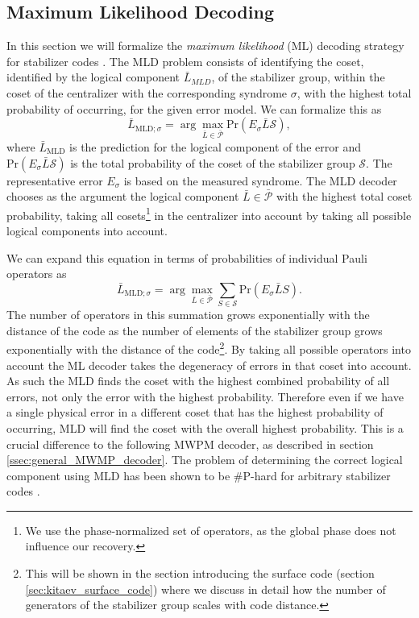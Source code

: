 \subsection{Maximum Likelihood Decoding}\label{ssec:general_ML_decoder}

In this section we will formalize the \emph{maximum likelihood} (ML) decoding strategy for stabilizer codes \cite{mld_decoding_intro_luis}.
The MLD problem consists of identifying the coset, identified by the logical component $\bar{L}_{MLD}$, of the stabilizer group, 
within the coset of the centralizer with the corresponding syndrome $\sigma$, with the highest total probability of occurring, for the given error model.
We can formalize this as
\begin{equation}
    \bar{L}_{\text{MLD};\sigma} = \arg \max_{\bar{L} \in  {\bar{\mathcal{P}}}} \text{Pr}(E_\sigma \bar{L} \mathcal{S}), 
\end{equation}
where $\bar{L}_{\text{MLD}}$ is the prediction for the logical component of the error and
$\text{Pr}(E_\sigma \bar{L}\mathcal{S})$ is the total probability of the coset of the stabilizer group $\mathcal{S}$. 
The representative error $E_\sigma$ is based on the measured syndrome. 
The MLD decoder chooses as the argument the logical component $\bar{L} \in {\bar{\mathcal{P}}}$ with the highest total coset probability, 
taking all cosets\footnote{
    We use the phase-normalized set of operators, as the global phase does not influence our recovery.
} in the centralizer into account by taking all possible logical components into account. 

We can expand this equation in terms of probabilities of individual Pauli operators as 
\begin{equation}
    \bar{L}_{\text{MLD};\sigma} = \arg \max_{\bar{L} \in  {\bar{\mathcal{P}}}} \sum_{S \in \mathcal{S}} \text{Pr}(E_\sigma\bar{L}S). 
\end{equation}
The number of operators in this summation grows exponentially with the distance of the code as the number of elements of the stabilizer group grows exponentially with the distance of the code\footnote{
    This will be shown in the section introducing the surface code (section \ref{sec:kitaev_surface_code}) where we discuss in detail how the number of generators of the stabilizer group scales with code distance. 
}.
By taking all possible operators into account the ML decoder takes the degeneracy of errors in that coset into account.
As such the MLD finds the coset with the highest combined probability of all errors, not only the error with the highest probability.
Therefore even if we have a single physical error in a different coset that has the highest probability of occurring, MLD will find the coset with the overall highest probability.
This is a crucial difference to the following MWPM decoder, as described in section \ref{ssec:general_MWMP_decoder}.
The problem of determining the correct logical component using MLD has been shown to be $\#$P-hard for arbitrary stabilizer codes \cite{MP_sharp_P_hard}.


